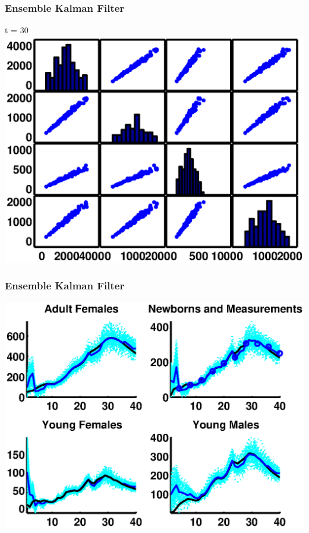 \documentclass[mathserif]{beamer}
\begin{document}
\begin{frame}
\begin{center}
\frametitle{Ensemble Kalman Filter}
t = 30
\includegraphics[width=1\textwidth]{ol30cov}
\end{center}
\end{frame}

\begin{frame}
\begin{center}
\frametitle{Ensemble Kalman Filter}
\includegraphics[width=1\textwidth]{filtered}
\end{center}
\end{frame}
\end{document}
